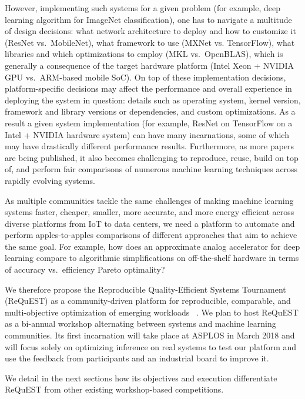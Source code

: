\documentclass[10pt,letterpaper,twocolumn]{article}
\begin{document}
However, implementing such systems for a given problem 
(for example, deep learning algorithm for ImageNet classification), 
one has to navigate a multitude of design decisions: 
what network architecture to deploy and how to customize it (ResNet vs.\ MobileNet), 
what framework to use (MXNet vs. TensorFlow), 
what libraries and which optimizations to employ (MKL vs.\ OpenBLAS),
which is generally a consequence of the target
hardware platform (Intel Xeon + NVIDIA GPU vs.\ ARM-based mobile SoC). 
%
On top of these implementation decisions,
platform-specific decisions may affect the performance and
overall experience in deploying the system in question:
details such as operating system, kernel version, framework
and library versions or dependencies, and custom optimizations.
%
As a result a given system implementation (for example, ResNet
on TensorFlow on a Intel + NVIDIA hardware system) can have
many incarnations, some of which may have drastically
different performance results. 
%
Furthermore, as more papers are being published, it also becomes 
challenging to reproduce, reuse, build on top of, and perform 
fair comparisons of numerous machine learning techniques 
across rapidly evolving systems.

As multiple communities tackle the same challenges 
of making machine learning systems 
faster, cheaper, smaller, more accurate, and more energy efficient 
across diverse platforms from IoT to data centers, 
we need a platform to automate and perform apples-to-apples comparisons 
of different approaches that aim to achieve the same goal. 
%
For example, how does an approximate analog accelerator
for deep learning compare to algorithmic simplifications
on off-the-shelf hardware in terms of accuracy vs.\ efficiency
Pareto optimality?

We therefore propose the Reproducible Quality-Efficient Systems
Tournament (ReQuEST) as a community-driven platform 
for reproducible, comparable, and multi-objective 
optimization of emerging workloads
~\cite{request}.
%
We plan to host ReQuEST as a bi-annual workshop alternating
between systems and machine learning communities.
%
Its first incarnation will take place at ASPLOS in March 2018
and will focus solely on optimizing inference on real systems 
to test our platform and use the feedback from participants and
an industrial board
to improve it.

We detail in the next sections how its objectives and
execution differentiate ReQuEST from other existing workshop-based
competitions.
\end{document}
